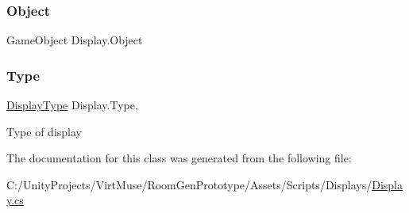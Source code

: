 \subsubsection{\texorpdfstring{Object}{Object}}
{\footnotesize\ttfamily Game\+Object Display.\+Object\hspace{0.3cm}{\ttfamily [get]}}

\mbox{\label{class_display_a2c80ba13fff1fd81aaa6915b28e8c14f}} 
\subsubsection{\texorpdfstring{Type}{Type}}
{\footnotesize\ttfamily \mbox{\hyperlink{class_display_a7f7abc559192ef7e8f4a03382d3492d7}{Display\+Type}} Display.\+Type\hspace{0.3cm}{\ttfamily [get]}, {}}



Type of display 



The documentation for this class was generated from the following file\+:\begin{DoxyCompactItemize}
\item 
C\+:/\+Unity\+Projects/\+Virt\+Muse/\+Room\+Gen\+Prototype/\+Assets/\+Scripts/\+Displays/\mbox{\hyperlink{_display_8cs}{Display.\+cs}}\end{DoxyCompactItemize}
